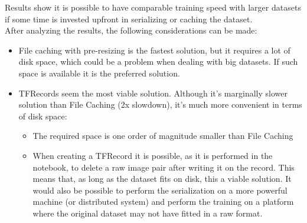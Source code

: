 \documentclass[a4paper,12pt]{article}
\begin{document}
Results show it is possible to have comparable training speed with larger datasets if some time is invested upfront in serializing or caching the dataset.\\
After analyzing the results, the following considerations can be made:
\begin{itemize}
\item File caching with pre-resizing is the fastest solution, but it requires a lot of disk space, which could be a problem when dealing with big datasets. If such space is available it is the preferred solution.
\item TFRecords seem the most viable solution. Although it's marginally slower solution than File Caching (2x slowdown), it's much more convenient in terms of disk space:
\begin{itemize}
\item The required space is one order of magnitude smaller than File Caching
\item When creating a TFRecord it is possible, as it is performed in the notebook, to delete a raw image pair after writing it on the record. This means that, as long as the dataset fits on disk, this a viable solution. It would also be possible to perform the serialization on a more powerful machine (or distributed system) and perform the training on a platform where the original dataset may not have fitted in a raw format.
\end{itemize}
\end{itemize}
\end{document}
